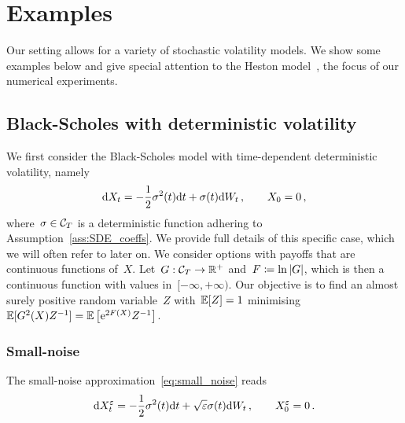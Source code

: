 \section{Examples}\label{sec:Examples}
Our setting allows for a variety of stochastic volatility models. 
We show some examples below
and give special attention to the Heston model~\cite{Heston1993AOptions}, the focus of our numerical experiments. 


\subsection{Black-Scholes with deterministic volatility}\label{sec:BS}
We first consider the Black-Scholes model with
time-dependent deterministic volatility, namely
$$
\mathrm{d} X_t = -\frac{1}{2}\sigma^2(t) \mathrm{d} t + \sigma(t) \mathrm{d} W_t\,, \qquad X_0 = 0\,,
$$
where~$\sigma\in \mathcal{C}_T$ is a deterministic function adhering to Assumption~\ref{ass:SDE_coeffs}. 
We provide full details of this specific case, 
which we will often refer to later on.
We consider options with payoffs that are continuous functions of~$X$. 
Let~$G:\mathcal{C}_{T}\rightarrow\mathbb{R}^+$ and~$F \coloneqq \ln|G|$, 
which is then a continuous function with values in~$[-\infty,+\infty)$. %
Our objective is to find an almost surely positive random variable~$Z$ with~$\mathbb{E}[Z] = 1$ minimising~$\mathbb{E}[G^2(X)Z^{-1}] = \mathbb{E}\left[\mathrm{e}^{2F(X)}Z^{-1}\right]$.

\subsubsection{Small-noise}
The small-noise approximation~\eqref{eq:small_noise} reads
$$
\mathrm{d} X_t^{\varepsilon} = -\frac{1}{2}\sigma^2(t)\mathrm{d} t + \sqrt{\varepsilon}\sigma(t) \mathrm{d} W_t\,, \qquad X_0 ^{\varepsilon} = 0\,.
$$

